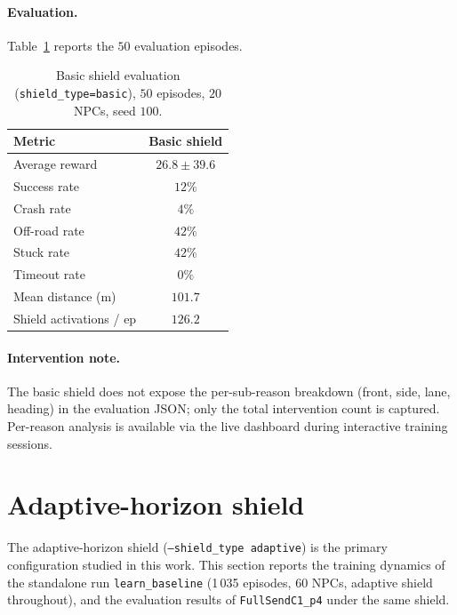 \paragraph{Evaluation.}
Table~\ref{tab:basic-eval} reports the \(50\) evaluation episodes.

\begin{table}[H]
  \centering
  \caption{Basic shield evaluation (\texttt{shield\_type=basic}), \(50\) episodes,
           \(20\) NPCs, seed \(100\).}
  \label{tab:basic-eval}
  \small
  \begin{tabular}{@{}lc@{}}
    \toprule
    \textbf{Metric} & \textbf{Basic shield} \\
    \midrule
    Average reward           & $26.8 \pm 39.6$ \\
    Success rate             & $12\%$ \\
    Crash rate               & $4\%$ \\
    Off-road rate            & $42\%$ \\
    Stuck rate               & $42\%$ \\
    Timeout rate             & $0\%$ \\
    Mean distance (m)        & $101.7$ \\
    Shield activations / ep  & $126.2$ \\
    \bottomrule
  \end{tabular}
\end{table}

\paragraph{Intervention note.}
The basic shield does not expose the per-sub-reason breakdown (front, side, lane, heading)
in the evaluation JSON; only the total intervention count is captured. Per-reason analysis
is available via the live dashboard during interactive training sessions.

\section{Adaptive-horizon shield}\label{sec:exp-adaptive}

The adaptive-horizon shield (\texttt{--shield\_type adaptive}) is the primary configuration
studied in this work. This section reports the training dynamics of the standalone run
\texttt{learn\_baseline} (1\,035 episodes, \(60\) NPCs, adaptive shield throughout), and
the evaluation results of \texttt{FullSendC1\_p4} under the same shield.

